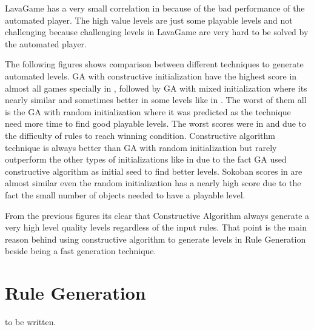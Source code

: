 LavaGame has a very small correlation in  because of the bad performance of the automated player. The high value levels are just some playable levels and not challenging because challenging levels in LavaGame are very hard to be solved by the automated player.


The following figures shows comparison between different techniques to generate automated levels. GA with constructive initialization have the highest score in almost all games specially in , followed by GA with mixed initialization where its nearly similar and sometimes better in some levels like in . The worst of them all is the GA with random initialization where it was predicted as the technique need more time to find good playable levels. The worst scores were in  and  due to the difficulty of rules to reach winning condition. Constructive algorithm technique is always better than GA with random initialization but rarely outperform the other types of initializations like in  due to the fact GA used constructive algorithm as initial seed to find better levels. Sokoban scores in  are almost similar even the random initialization has a nearly high score due to the fact the small number of objects needed to have a playable level.






From the previous figures its clear that Constructive Algorithm always generate a very high level quality levels regardless of the input rules. That point is the main reason behind using constructive algorithm to generate levels in Rule Generation beside being a fast generation technique.

\section{Rule Generation}
to be written.
